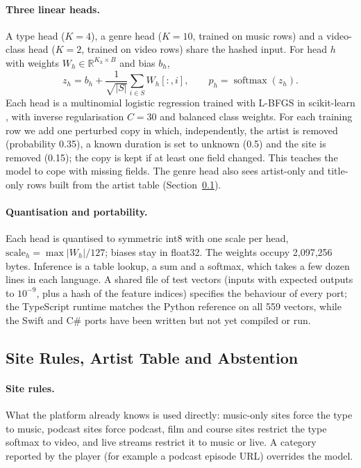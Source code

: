 \documentclass[11pt]{article}
\begin{document}
\paragraph{Three linear heads.} A type head ($K=4$), a genre head ($K=10$, trained on music rows) and a video-class head ($K=2$, trained on video rows) share the hashed input. For head $h$ with weights $W_h \in \mathbb{R}^{K_h \times B}$ and bias $b_h$,
\begin{equation}
  z_h = b_h + \frac{1}{\sqrt{|S|}} \sum_{i \in S} W_h[:, i], \qquad p_h = \operatorname{softmax}(z_h).
  \label{eq:logits}
\end{equation}
Each head is a multinomial logistic regression trained with L-BFGS \citep{liu1989limited} in scikit-learn \citep{pedregosa2011scikitlearn}, with inverse regularisation $C = 30$ and balanced class weights. For each training row we add one perturbed copy in which, independently, the artist is removed (probability 0.35), a known duration is set to unknown (0.5) and the site is removed (0.15); the copy is kept if at least one field changed. This teaches the model to cope with missing fields. The genre head also sees artist-only and title-only rows built from the artist table (Section~\ref{sec:rules}).

\paragraph{Quantisation and portability.} Each head is quantised to symmetric int8 with one scale per head, $\mathrm{scale}_h = \max |W_h| / 127$; biases stay in float32. The weights occupy 2,097,256 bytes. Inference is a table lookup, a sum and a softmax, which takes a few dozen lines in each language. A shared file of test vectors (inputs with expected outputs to $10^{-9}$, plus a hash of the feature indices) specifies the behaviour of every port; the TypeScript runtime matches the Python reference on all 559 vectors, while the Swift and C\# ports have been written but not yet compiled or run.

\subsection{Site Rules, Artist Table and Abstention}
\label{sec:rules}

\paragraph{Site rules.} What the platform already knows is used directly: music-only sites force the type to music, podcast sites force podcast, film and course sites restrict the type softmax to video, and live streams restrict it to music or live. A category reported by the player (for example a podcast episode URL) overrides the model.
\end{document}

